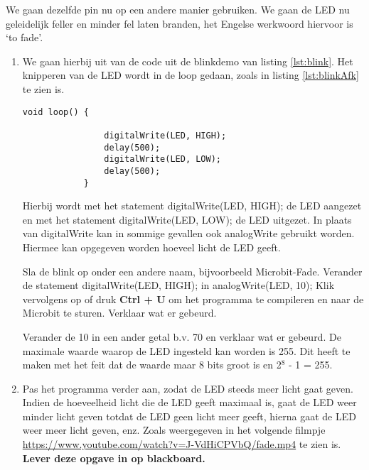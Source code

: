 We gaan dezelfde pin nu op een andere manier gebruiken. We gaan de LED nu geleidelijk feller en minder fel laten branden, het Engelse werkwoord hiervoor is ‘to fade’. 
\begin{enumerate}
	\item  We gaan hierbij uit van de code uit de blinkdemo van listing \ref{lst:blink}.  Het knipperen van de LED wordt
	in de \textcolor{arduinoGreen}{loop} gedaan, zoals in listing \ref{lst:blinkAfk} te zien is.
		\begin{lstlisting}[caption= Het knipperen van de LED.,label={lst:blinkAfk},firstnumber=15]		
			void loop() {
				
				digitalWrite(LED, HIGH);
				delay(500);
				digitalWrite(LED, LOW);
				delay(500);
			}
		\end{lstlisting} 
		Hierbij wordt met het statement \textcolor{arduinoOrange}{digitalWrite}(LED, \textcolor{arduinoBlue}{HIGH}); de LED aangezet en met het statement \textcolor{arduinoOrange}{digitalWrite}(LED, \textcolor{arduinoBlue}{LOW}); de LED uitgezet.  In plaats van \textcolor{arduinoOrange}{digitalWrite} kan in sommige gevallen ook \textcolor{arduinoOrange}{analogWrite} gebruikt worden. Hiermee kan opgegeven worden hoeveel licht de LED geeft.
		
		Sla de blink op onder een andere naam, bijvoorbeeld Microbit-Fade. Verander de statement  \textcolor{arduinoOrange}{digitalWrite}(LED, \textcolor{arduinoBlue}{HIGH}); in \textcolor{arduinoOrange}{analogWrite}(LED, 10);
		Klik vervolgens op  of druk \colorbox{mygray}{\textbf{Ctrl + U}} om het programma te compileren en naar de Microbit te sturen. Verklaar wat er gebeurd.
		
		Verander de 10 in een ander getal b.v. 70 en verklaar wat er gebeurd. De maximale waarde waarop de LED ingesteld kan worden is 255. Dit heeft te maken met het feit dat de waarde maar 8 bits groot is en 2$^{8}$ - 1 = 255.
		
		\item  Pas het programma verder aan, zodat de LED steeds meer licht gaat geven. Indien de hoeveelheid licht die de LED geeft maximaal is, gaat de LED weer minder licht geven totdat de LED geen licht meer geeft, hierna gaat de LED weer meer licht geven, enz. Zoals weergegeven in het volgende filmpje\\  
		\href{https://www.youtube.com/watch?v=J-VdHiCPVbQ/fade.mp4}{https://www.youtube.com/watch?v=J-VdHiCPVbQ/fade.mp4} te zien is.\\
		\textbf{Lever deze opgave in op blackboard.}
		
	\end{enumerate}
	
